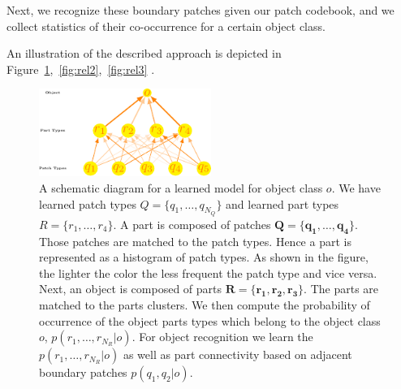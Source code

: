 \documentclass[a4paper,11pt,pdf]{pacmanreport}
\begin{document}
Next, we recognize these boundary patches given our patch codebook,
and we collect statistics of their co-occurrence for a certain object
class.

An illustration of the described approach is depicted in Figure~\ref{fig:rel},~\ref{fig:rel2},~\ref{fig:rel3} .
\begin{figure}[h!]
\begin{center}
\includegraphics[width=0.5\textwidth,height=0.2\textheight]{rel2.pdf}
\end{center}
\caption{A schematic diagram for a learned model for object class $o$. We have learned patch types $Q=\{q_1,\ldots,q_{N_{Q}}\}$ and learned part types $R=\{r_1,\ldots,r_4\}$. A part is composed of patches $\mathbf{Q}=\{\mathbf{q_1},\ldots,\mathbf{q_4}\}$. Those patches are matched to the patch types. Hence a part is represented as a histogram of patch types. As shown in the figure, the lighter the color the less frequent the patch type and vice versa. Next, an object is composed of parts $\mathbf{R}=\{\mathbf{r_1},\mathbf{r_2},\mathbf{r_3}\}$. The parts are matched to the parts clusters. We then compute the probability of occurrence of the object parts types which belong to the object class $o$, $p(r_1,\ldots,r_{N_{R}} \vert o)$. For object recognition we learn the $p(r_1,\ldots,r_{N_{R}} \vert o)$ as well as part connectivity based on adjacent boundary patches $p(q_{1},q_{2} \vert o)$. 
} 
\label{fig:rel}
\end{figure}
\end{document}
